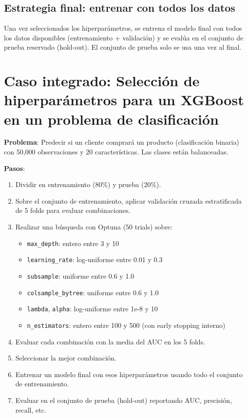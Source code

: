 \documentclass[12pt,a4paper,openany,oneside]{book}
\begin{document}
\subsection{Estrategia final: entrenar con todos los datos}
Una vez seleccionados los hiperparámetros, se entrena el modelo final con todos los datos disponibles (entrenamiento + validación) y se evalúa en el conjunto de prueba reservado (hold-out). El conjunto de prueba solo se usa una vez al final.

\section{Caso integrado: Selección de hiperparámetros para un XGBoost en un problema de clasificación}

\textbf{Problema}: Predecir si un cliente comprará un producto (clasificación binaria) con 50,000 observaciones y 20 características. Las clases están balanceadas.

\textbf{Pasos}:
\begin{enumerate}
    \item Dividir en entrenamiento (80\%) y prueba (20\%).
    \item Sobre el conjunto de entrenamiento, aplicar validación cruzada estratificada de 5 folds para evaluar combinaciones.
    \item Realizar una búsqueda con Optuna (50 trials) sobre:
        \begin{itemize}
            \item \texttt{max\_depth}: entero entre 3 y 10
            \item \texttt{learning\_rate}: log-uniforme entre 0.01 y 0.3
            \item \texttt{subsample}: uniforme entre 0.6 y 1.0
            \item \texttt{colsample\_bytree}: uniforme entre 0.6 y 1.0
            \item \texttt{lambda}, \texttt{alpha}: log-uniforme entre 1e-8 y 10
            \item \texttt{n\_estimators}: entero entre 100 y 500 (con early stopping interno)
        \end{itemize}
    \item Evaluar cada combinación con la media del AUC en los 5 folds.
    \item Seleccionar la mejor combinación.
    \item Entrenar un modelo final con esos hiperparámetros usando todo el conjunto de entrenamiento.
    \item Evaluar en el conjunto de prueba (hold-out) reportando AUC, precisión, recall, etc.
\end{enumerate}
\end{document}
